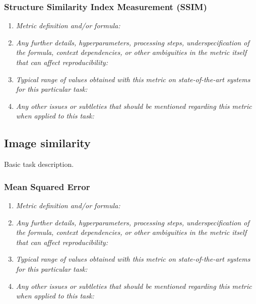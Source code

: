 \documentclass[a4paper,11pt]{article}
\begin{document}
        \subsubsection{Structure Similarity Index Measurement (SSIM)}
            \begin{enumerate}[label=\alph*.]
                \item \textit{Metric definition and/or formula:}
                \bigskip
                \item \textit{Any further details, hyperparameters, processing steps, underspecification of the formula, context dependencies, or other ambiguities in the metric itself that can affect reproducibility:}
                \bigskip
                \item \textit{Typical range of values obtained with this metric on state-of-the-art systems for this particular task:}
                \bigskip
                \item \textit{Any other issues or subtleties that should be mentioned regarding this metric when applied to this task:}
                \bigskip
            \end{enumerate}

    \subsection{Image similarity}
        Basic task description.
        \subsubsection{Mean Squared Error}
            \begin{enumerate}[label=\alph*.]
                \item \textit{Metric definition and/or formula:}
                \bigskip
                \item \textit{Any further details, hyperparameters, processing steps, underspecification of the formula, context dependencies, or other ambiguities in the metric itself that can affect reproducibility:}
                \bigskip
                \item \textit{Typical range of values obtained with this metric on state-of-the-art systems for this particular task:}
                \bigskip
                \item \textit{Any other issues or subtleties that should be mentioned regarding this metric when applied to this task:}
                \bigskip
            \end{enumerate}
\end{document}
